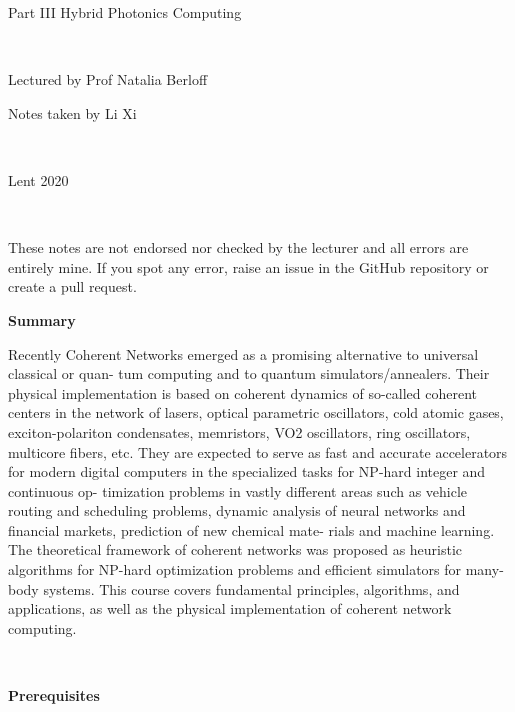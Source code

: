 \documentclass{article}
\begin{document}
    \begin{titlepage}
        \vfill
        \begin{center}

          {\huge Part III Hybrid Photonics Computing \par}
          
          \
          
          \Large Lectured by Prof Natalia Berloff 
          
          \large Notes taken by Li Xi

          \ 

          Lent 2020

          \

          \normalsize
          These notes are not endorsed nor checked by the lecturer and all errors are entirely mine. If you spot any error, raise an issue in the GitHub repository or create a pull request. 
          
        \end{center}
        
        \vfill

        \begin{flushleft}
          \Large \textbf{Summary}
        \end{flushleft}
        
        \noindent Recently Coherent Networks emerged as a promising alternative to universal classical or quan- tum computing and to quantum simulators/annealers. Their physical implementation is based on coherent dynamics of so-called coherent centers in the network of lasers, optical parametric oscillators, cold atomic gases, exciton-polariton condensates, memristors, VO2 oscillators, ring oscillators, multicore fibers, etc. They are expected to serve as fast and accurate accelerators for modern digital computers in the specialized tasks for NP-hard integer and continuous op- timization problems in vastly different areas such as vehicle routing and scheduling problems, dynamic analysis of neural networks and financial markets, prediction of new chemical mate- rials and machine learning. The theoretical framework of coherent networks was proposed as heuristic algorithms for NP-hard optimization problems and efficient simulators for many-body systems. This course covers fundamental principles, algorithms, and applications, as well as the physical implementation of coherent network computing.

        \

        \begin{flushleft}
          \Large \textbf{Prerequisites}
        \end{flushleft}


\end{titlepage}
\end{document}
